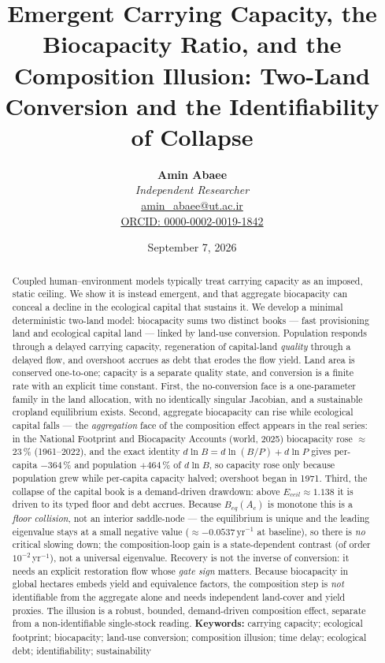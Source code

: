 \documentclass[11pt]{article}
\title{Emergent Carrying Capacity, the Biocapacity Ratio, and the Composition Illusion: Two-Land Conversion and the Identifiability of Collapse}
\author{
  \textbf{Amin Abaee}\\
  \textit{Independent Researcher}\\
  \href{mailto:amin_abaee@ut.ac.ir}{amin\_abaee@ut.ac.ir}\\
  \href{https://orcid.org/0000-0002-0019-1842}{ORCID: 0000-0002-0019-1842}
}
\date{September 7, 2026}
\begin{document}
\maketitle

\begin{abstract}
Coupled human--environment models typically treat carrying capacity as an imposed, static ceiling. We show it is instead emergent, and that aggregate biocapacity can conceal a decline in the ecological capital that sustains it. We develop a minimal deterministic two-land model: biocapacity sums two distinct books --- fast provisioning land and ecological capital land --- linked by land-use conversion. Population responds through a delayed carrying capacity, regeneration of capital-land \emph{quality} through a delayed flow, and overshoot accrues as debt that erodes the flow yield. Land area is conserved one-to-one; capacity is a separate quality state, and conversion is a finite rate with an explicit time constant. First, the no-conversion face is a one-parameter family in the land allocation, with no identically singular Jacobian, and a sustainable cropland equilibrium exists. Second, aggregate biocapacity can rise while ecological capital falls --- the \emph{aggregation} face of the composition effect appears in the real series: in the National Footprint and Biocapacity Accounts (world, 2025) biocapacity rose $\approx$23\,\% (1961--2022), and the exact identity $d\ln B=d\ln(B/P)+d\ln P$ gives per-capita $-364$\,\% and population $+464$\,\% of $d\ln B$, so capacity rose only because population grew while per-capita capacity halved; overshoot began in 1971. Third, the collapse of the capital book is a demand-driven drawdown: above $E_{ceil}\approx1.138$ it is driven to its typed floor and debt accrues. Because $B_{eq}(A_c)$ is monotone this is a \emph{floor collision}, not an interior saddle-node --- the equilibrium is unique and the leading eigenvalue stays at a small negative value ($\approx-0.0537\,\text{yr}^{-1}$ at baseline), so there is \emph{no} critical slowing down; the composition-loop gain is a state-dependent contrast (of order $10^{-2}\,$yr$^{-1}$), not a universal eigenvalue. Recovery is not the inverse of conversion: it needs an explicit restoration flow whose \emph{gate sign} matters. Because biocapacity in global hectares embeds yield and equivalence factors, the composition step is \emph{not} identifiable from the aggregate alone and needs independent land-cover and yield proxies. The illusion is a robust, bounded, demand-driven composition effect, separate from a non-identifiable single-stock reading.
\medskip
\noindent\textbf{Keywords: } carrying capacity; ecological footprint; biocapacity; land-use conversion; composition illusion; time delay; ecological debt; identifiability; sustainability
\end{abstract}
\end{document}
